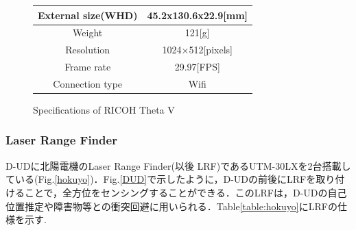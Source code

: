 \documentclass[12pt]{sonota/aislab}
\begin{document}
\begin{figure}
\begin{minipage}{0.5\textwidth}
\begin{center}
\makeatletter
\def\@captype{table}
\makeatother
\caption{Specifications of RICOH Theta V}
	\begin{tabular}[tbp]{|c|c|}
		\hline 
		External size(WHD) & 45.2x130.6x22.9[mm] \\\hline
		Weight & 121[g] \\\hline
		Resolution & 1024×512[pixels] \\\hline
		Frame rate & 29.97[FPS] \\\hline
		Connection type & Wifi \\\hline
	\end{tabular}
\label{table:ThetaV_TABLE}
\end{center}
\end{minipage}
\end{figure}

\subsubsection{Laser Range Finder}
D-UDに北陽電機のLaser Range Finder(以後 LRF)であるUTM-30LXを2台搭載している(Fig.\ref{hokuyo})．Fig.\ref{DUD}で示したように，D-UDの前後にLRFを取り付けることで，全方位をセンシングすることができる．このLRFは，D-UDの自己位置推定や障害物等との衝突回避に用いられる．Table\ref{table:hokuyo}にLRFの仕様を示す.
\end{document}
